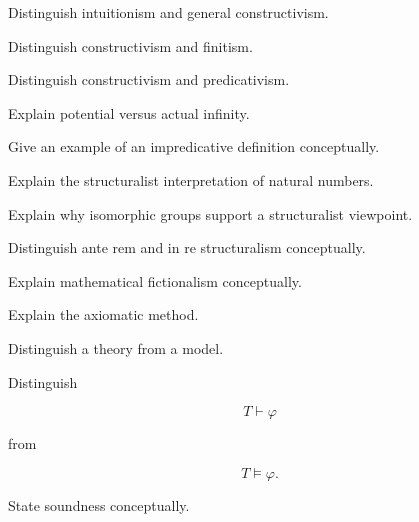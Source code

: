\begin{exercise}[2]
Distinguish intuitionism and general constructivism.
\end{exercise}

\begin{exercise}[2]
Distinguish constructivism and finitism.
\end{exercise}

\begin{exercise}[2]
Distinguish constructivism and predicativism.
\end{exercise}

\begin{exercise}[2]
Explain potential versus actual infinity.
\end{exercise}

\begin{exercise}[3]
Give an example of an impredicative definition conceptually.
\end{exercise}

\begin{exercise}[2]
Explain the structuralist interpretation of natural numbers.
\end{exercise}

\begin{exercise}[3]
Explain why isomorphic groups support a structuralist viewpoint.
\end{exercise}

\begin{exercise}[2]
Distinguish ante rem and in re structuralism conceptually.
\end{exercise}

\begin{exercise}[2]
Explain mathematical fictionalism conceptually.
\end{exercise}

\begin{exercise}[2]
Explain the axiomatic method.
\end{exercise}

\begin{exercise}[2]
Distinguish a theory from a model.
\end{exercise}

\begin{exercise}[2]
Distinguish

\[
T\vdash\varphi
\]

from

\[
T\models\varphi.
\]
\end{exercise}

\begin{exercise}[2]
State soundness conceptually.
\end{exercise}

